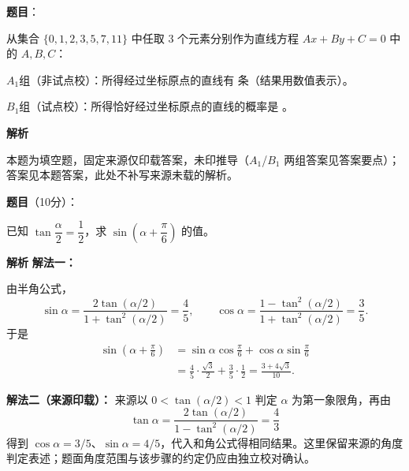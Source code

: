 \begin{answer}

\textbf{题目}：

从集合 $\{0,1,2,3,5,7,11\}$ 中任取 3 个元素分别作为直线方程 $Ax+By+C=0$ 中的 $A,B,C$：

$A_1$组（非试点校）：所得经过坐标原点的直线有 \gkblank{} 条（结果用数值表示）。

$B_1$组（试点校）：所得恰好经过坐标原点的直线的概率是 \gkblank{}。

\textbf{解析}

本题为填空题，固定来源仅印载答案，未印推导（$A_1$/$B_1$ 两组答案见答案要点）；答案见本题答案，此处不补写来源未载的解析。


\end{answer}
\begin{answer}

\textbf{题目}（10分）：

已知 $\tan\dfrac\alpha2=\dfrac12$，求 $\sin\left(\alpha+\dfrac\pi6\right)$ 的值。

\textbf{解析}
\textbf{解法一：}

由半角公式，
\nopagebreak[4]
\[\sin\alpha=\frac{2\tan(\alpha/2)}{1+\tan^2(\alpha/2)}=\frac45,\qquad
\cos\alpha=\frac{1-\tan^2(\alpha/2)}{1+\tan^2(\alpha/2)}=\frac35.\]
于是
\nopagebreak[4]
\[\begin{aligned}
\sin\left(\alpha+\frac\pi6\right)
&=\sin\alpha\cos\frac\pi6+\cos\alpha\sin\frac\pi6\\
&=\frac45\cdot\frac{\sqrt3}{2}+\frac35\cdot\frac12
=\frac{3+4\sqrt3}{10}.
\end{aligned}\]

\textbf{解法二（来源印载）：} 来源以 $0<\tan(\alpha/2)<1$ 判定 $\alpha$ 为第一象限角，再由
\nopagebreak[4]
\[\tan\alpha=\frac{2\tan(\alpha/2)}{1-\tan^2(\alpha/2)}=\frac43\]
得到 $\cos\alpha=3/5$、$\sin\alpha=4/5$，代入和角公式得相同结果。这里保留来源的角度判定表述；题面角度范围与该步骤的约定仍应由独立校对确认。


\end{answer}
